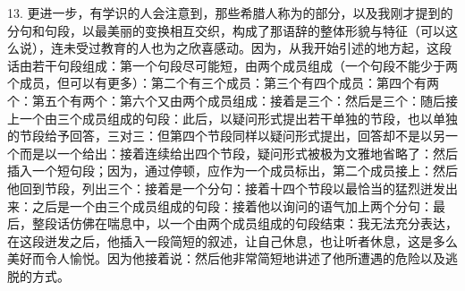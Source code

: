13. 更进一步，有学识的人会注意到，那些希腊人称为的部分，以及我刚才提到的分句和句段，以最美丽的变换相互交织，构成了那语辞的整体形貌与特征（可以这么说），连未受过教育的人也为之欣喜感动。因为，从我开始引述的地方起，这段话由若干句段组成：第一个句段尽可能短，由两个成员组成（一个句段不能少于两个成员，但可以有更多）：第二个有三个成员：第三个有四个成员：第四个有两个：第五个有两个：第六个又由两个成员组成：接着是三个：然后是三个：随后接上一个由三个成员组成的句段：此后，以疑问形式提出若干单独的节段，也以单独的节段给予回答，三对三：但第四个节段同样以疑问形式提出，回答却不是以另一个而是以一个给出：接着连续给出四个节段，疑问形式被极为文雅地省略了：然后插入一个短句段；因为，通过停顿，应作为一个成员标出，第二个成员接上：然后他回到节段，列出三个：接着是一个分句：接着十四个节段以最恰当的猛烈迸发出来：之后是一个由三个成员组成的句段：接着他以询问的语气加上两个分句：最后，整段话仿佛在喘息中，以一个由两个成员组成的句段结束：我无法充分表达，在这段迸发之后，他插入一段简短的叙述，让自己休息，也让听者休息，这是多么美好而令人愉悦。因为他接着说：然后他非常简短地讲述了他所遭遇的危险以及逃脱的方式。\par


